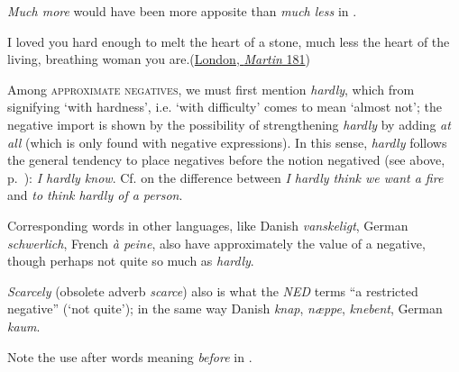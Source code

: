\textit{Much more} would have been more apposite than \textit{much less} in .

\ea \label{ex:04-259}
I loved you hard enough to melt the heart of a stone, much less the heart of the living, breathing woman you are.\hfill(\href{https://archive.org/details/martineden00lond/page/180/mode/2up?q=\%22melt+the+heart\%22&view=theater}{London, \textit{Martin} 181})
\z
{}

\label{sec:incomplete-negation}

Among \textsc{approximate negatives}, we must first mention \textit{hardly}, which from signifying `with hardness', i.e. `with difficulty' comes to mean `almost not'; the negative import is shown by the possibility of strengthening \textit{hardly} by adding \textit{at all} (which is only found with negative expressions). In this sense, \textit{hardly} follows the general tendency to place negatives before the notion negatived (see above, p.~\pageref{para:naturaltendency}): \textit{I hardly know}. Cf. \citet[\href{https://archive.org/details/in.ernet.dli.2015.83994/page/n37/mode/2up?view=theater}{§1847}]{sweet1898new2} on the difference between \textit{I hardly think we want a fire} and \textit{to think hardly of a person}.

Corresponding words in other languages, like Danish \textit{vanskeligt}, German \textit{schwerlich}, French \textit{à peine}, also have approximately the value of a negative, though perhaps not quite so much as \textit{hardly}.

\textit{Scarcely} (obsolete adverb \textit{scarce}) also is what the \textit{NED} terms ``a restricted negative'' (`not quite'); in the same way Danish \textit{knap}, \textit{næppe}, \textit{knebent}, German \textit{kaum}.

Note the use after words meaning \textit{before} in .\largerpage[2]

